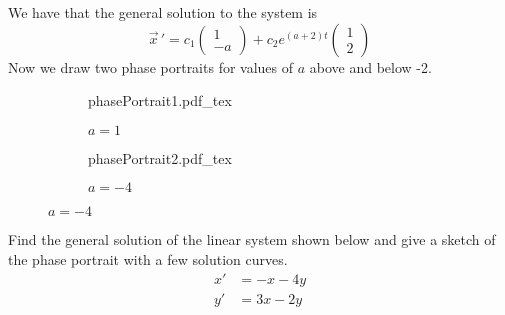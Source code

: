 \documentclass[11pt, titlepage]{article}
\begin{document}
\begin{solution}
    We have that the general solution to the system is
    \begin{equation*}
      \vec{x} \,' = c_{1}
      \begin{pmatrix}
        1 \\
        -a
      \end{pmatrix}
      + c_{2} e^{(a + 2) t}
      \begin{pmatrix}
        1 \\
        2
      \end{pmatrix}
    \end{equation*}
    Now we draw two phase portraits for values of \(a\) above and below -2.
    \begin{figure}[h]
      \centering
      \begin{subfigure}[b]{0.35\textwidth}
        \centering
        \def\svgwidth{0.9\columnwidth}
        {phasePortrait1.pdf_tex}
        \captionsetup{labelformat=empty}
        \caption{\(a = 1\)}
      \end{subfigure}
      \begin{subfigure}[b]{0.35\textwidth}
        \centering
        \def\svgwidth{0.9\columnwidth}
        {phasePortrait2.pdf_tex}
        \captionsetup{labelformat=empty}
        \caption{\(a = -4\)}
      \end{subfigure}
    \end{figure}

  \end{solution}

  \pagebreak

  \begin{problem}[Judson 3.4.3]
    Find the general solution of the linear system shown below and give a sketch of the phase portrait with a few solution curves.
    \begin{align*}
      x' &= -x - 4y \\
      y' &= 3x - 2y
    \end{align*}
  \end{problem}
\end{document}

